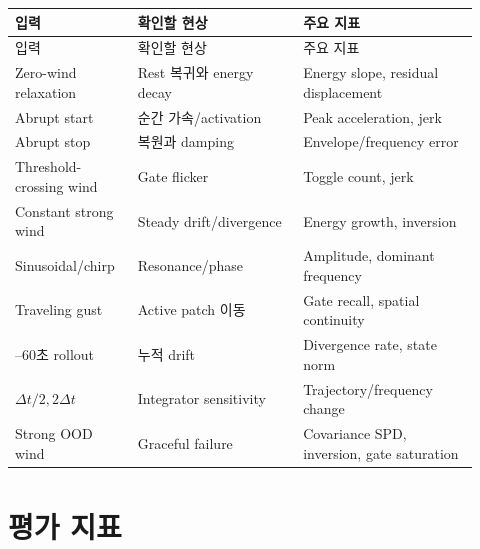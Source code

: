 \documentclass[11pt,a4paper]{article}
\begin{document}
\begin{longtable}{L{0.24\linewidth}L{0.33\linewidth}L{0.35\linewidth}}
\toprule
입력 & 확인할 현상 & 주요 지표 \\
\midrule
\endfirsthead
\toprule
입력 & 확인할 현상 & 주요 지표 \\
\midrule
\endhead
Zero-wind relaxation & Rest 복귀와 energy decay & Energy slope, residual displacement \\
\addlinespace
Abrupt start & 순간 가속/activation & Peak acceleration, jerk \\
\addlinespace
Abrupt stop & 복원과 damping & Envelope/frequency error \\
\addlinespace
Threshold-crossing wind & Gate flicker & Toggle count, jerk \\
\addlinespace
Constant strong wind & Steady drift/divergence & Energy growth, inversion \\
\addlinespace
Sinusoidal/chirp & Resonance/phase & Amplitude, dominant frequency \\
\addlinespace
Traveling gust & Active patch 이동 & Gate recall, spatial continuity \\
--60초 rollout & 누적 drift & Divergence rate, state norm \\
\addlinespace
\(\Delta t/2,2\Delta t\) & Integrator sensitivity & Trajectory/frequency change \\
\addlinespace
Strong OOD wind & Graceful failure & Covariance SPD, inversion, gate saturation \\
\bottomrule
\end{longtable}

\section{평가 지표}
\end{document}
